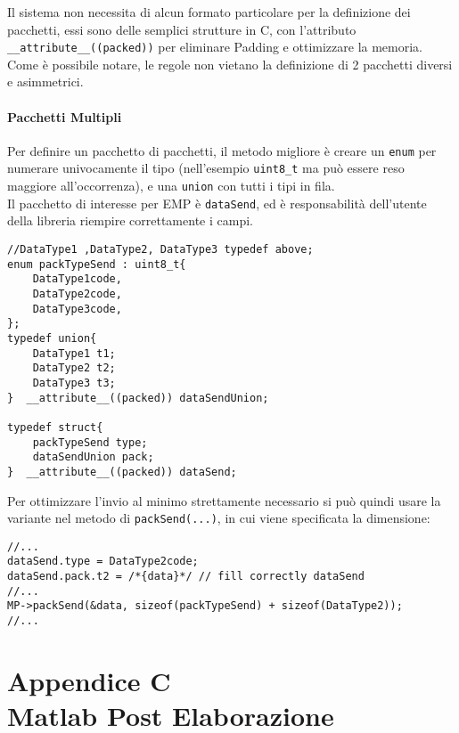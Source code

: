 Il sistema non necessita di alcun formato particolare per la definizione dei pacchetti, essi sono delle semplici strutture in C, con l'attributo \verb|__attribute__((packed))| per eliminare Padding e ottimizzare la memoria.
Come è possibile notare, le regole non vietano la definizione di 2 pacchetti diversi e asimmetrici.
\newpage

\subsubsection{Pacchetti Multipli}
Per definire un pacchetto di pacchetti, il metodo migliore è creare un \verb|enum| per numerare univocamente il tipo (nell'esempio \verb|uint8_t| ma può essere reso maggiore all'occorrenza), e una \verb|union| con tutti i tipi in fila.\\
Il pacchetto di interesse per EMP è \verb|dataSend|, ed è responsabilità dell'utente della libreria riempire correttamente i campi.
\begin{lstlisting}[style=cppStyle,caption={definizione Pacchetti Multipli},label=lst:EMPmultiplePack] 
//DataType1 ,DataType2, DataType3 typedef above;
enum packTypeSend : uint8_t{
	DataType1code,
	DataType2code,
	DataType3code,
};
typedef union{
	DataType1 t1;
	DataType2 t2;
	DataType3 t3;
}  __attribute__((packed)) dataSendUnion;

typedef struct{
	packTypeSend type;
	dataSendUnion pack;
}  __attribute__((packed)) dataSend;
\end{lstlisting}
\noindent
Per ottimizzare l'invio al minimo strettamente necessario si può quindi usare la variante nel metodo di \verb|packSend(...)|, in cui viene specificata la dimensione:

\begin{lstlisting}[style=cppStyle,caption={definizione Pacchetti Multipli},label=lst:EMPsendOptimize] 
//...
dataSend.type = DataType2code;
dataSend.pack.t2 = /*{data}*/ // fill correctly dataSend
//...    
MP->packSend(&data, sizeof(packTypeSend) + sizeof(DataType2));
//...

\end{lstlisting}
\chapter*{Appendice C\\ Matlab Post Elaborazione}\label{MatlabCode}
\setcounter{chapter}{\thechapter + 1}